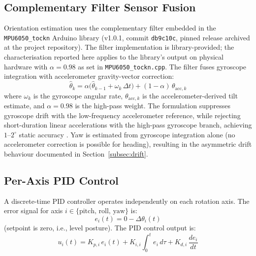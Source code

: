 \documentclass[journal]{IEEEtran}
\newcommand{\dg}{^{\circ}}
\begin{document}
\subsection{Complementary Filter Sensor Fusion}
\label{subsec:cf}
Orientation estimation uses the complementary filter embedded in
the \texttt{MPU6050\_tockn} Arduino library (v1.0.1,
commit \texttt{db9c10c}, pinned release archived at the project
repository).
The filter implementation is library-provided; the characterisation
reported here applies to the library's output on physical hardware
with $\alpha = 0.98$ as set in \texttt{MPU6050\_tockn.cpp}.
The filter fuses gyroscope integration with accelerometer
gravity-vector correction:
\begin{equation}
\hat{\theta}_k = \alpha\bigl(\hat{\theta}_{k-1} + \omega_k\,\Delta t\bigr)
                + (1-\alpha)\,\theta_{\text{acc},k}
\label{eq:cf}
\end{equation}
where $\omega_k$ is the gyroscope angular rate,
$\theta_{\text{acc},k}$ is the accelerometer-derived tilt
estimate, and $\alpha = 0.98$ is the high-pass weight.
The formulation suppresses gyroscope drift with the
low-frequency accelerometer reference, while rejecting
short-duration linear accelerations with the high-pass
gyroscope branch, achieving $1$--$2\dg$ static accuracy
\cite{oz2022complementary}.
Yaw is estimated from gyroscope integration alone (no
accelerometer correction is possible for heading), resulting
in the asymmetric drift behaviour documented in
Section~\ref{subsec:drift}.
\subsection{Per-Axis PID Control}
\label{subsec:pid}
A discrete-time PID controller operates independently on each
rotation axis.
The error signal for axis $i \in \{\text{pitch, roll, yaw}\}$ is:
\begin{equation}
e_i(t) = 0 - \Delta\theta_i(t)
\label{eq:error}
\end{equation}
(setpoint is zero, i.e., level posture).
The PID control output is:
\begin{equation}
u_i(t) = K_{p,i}\,e_i(t) + K_{i,i}\!\int_0^t\!e_i\,d\tau
        + K_{d,i}\,\frac{de_i}{dt}
\label{eq:pid}
\end{equation}
\end{document}
